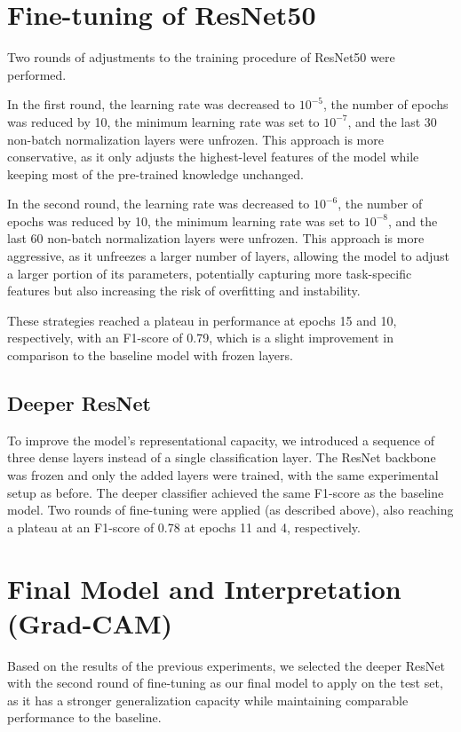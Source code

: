 \documentclass[12pt,a4paper]{article}
\begin{document}
\section{Fine-tuning of ResNet50}
Two rounds of adjustments to the training procedure of ResNet50 were performed.

In the first round, the learning rate was decreased to $10^{-5}$, the number of epochs was reduced by 10, the minimum learning rate was set to $10^{-7}$, and the last 30 non-batch normalization layers were unfrozen.
This approach is more conservative, as it only adjusts the highest-level features of the model while keeping most of the pre-trained knowledge unchanged.

In the second round, the learning rate was decreased to $10^{-6}$, the number of epochs was reduced by 10, the minimum learning rate was set to $10^{-8}$, and the last 60 non-batch normalization layers were unfrozen.
This approach is more aggressive, as it unfreezes a larger number of layers, allowing the model to adjust a larger portion of its parameters, potentially capturing more task-specific features but also increasing the risk of overfitting and instability.

These strategies reached a plateau in performance at epochs 15 and 10, respectively, with an F1-score of 0.79, which is a slight improvement in comparison to the baseline model with frozen layers.


\subsection{Deeper ResNet}

To improve the model's representational capacity, we introduced a sequence of three dense layers instead of a single classification layer.
The ResNet backbone was frozen and only the added layers were trained, with the same experimental setup as before.
The deeper classifier achieved the same F1-score as the baseline model.
Two rounds of fine-tuning were applied (as described above), also reaching a plateau at an F1-score of 0.78 at epochs 11 and 4, respectively.

\section {Final Model and Interpretation (Grad-CAM)}

Based on the results of the previous experiments, we selected the deeper ResNet with the second round of fine-tuning as our final model to apply on the test set, as it has a stronger generalization
capacity while maintaining comparable performance to the baseline.
\end{document}
